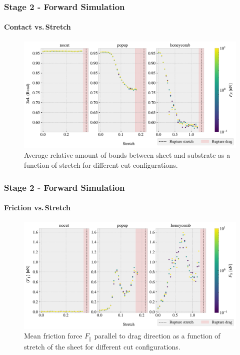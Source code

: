 \documentclass[
	10pt, %
]{beamer}
\begin{document}
\begin{frame}
	\frametitle{Stage 2 - Forward Simulation}
	\framesubtitle{Contact vs.\,Stretch}
	\begin{figure}
		\includegraphics[height=0.65\textheight]{figures/multi_stretch_area_compare.pdf}
		\caption{Average relative amount of bonds between sheet and substrate as a function of stretch for different cut configurations.}
	\end{figure}	
\end{frame}

\begin{frame}
	\frametitle{Stage 2 - Forward Simulation}
	\framesubtitle{Friction vs.\,Stretch}
	\begin{figure}
		\includegraphics[height=0.65\textheight]{figures/multi_stretch_mean_compare.pdf}
		\caption{Mean friction force $F_{\parallel}$ parallel to drag direction as a function of stretch of the sheet for different cut configurations.}
	\end{figure}	
\end{frame}
\end{document}
